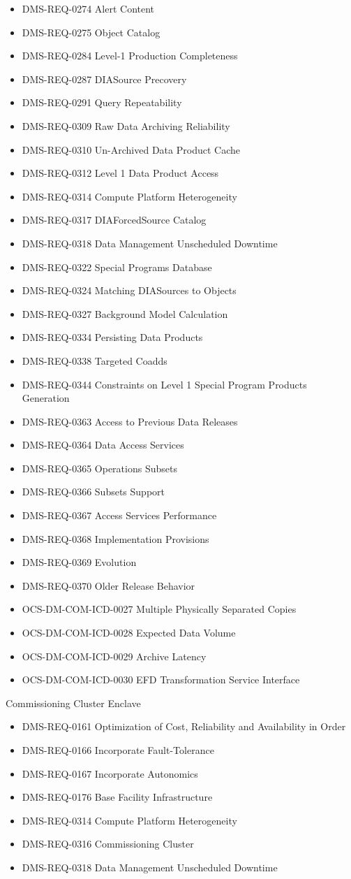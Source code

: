 \begin{itemize}
\item DMS-REQ-0274 Alert Content
\item DMS-REQ-0275 Object Catalog
\item DMS-REQ-0284 Level-1 Production Completeness
\item DMS-REQ-0287 DIASource Precovery
\item DMS-REQ-0291 Query Repeatability
\item DMS-REQ-0309 Raw Data Archiving Reliability
\item DMS-REQ-0310 Un-Archived Data Product Cache
\item DMS-REQ-0312 Level 1 Data Product Access
\item DMS-REQ-0314 Compute Platform Heterogeneity
\item DMS-REQ-0317 DIAForcedSource Catalog
\item DMS-REQ-0318 Data Management Unscheduled Downtime
\item DMS-REQ-0322 Special Programs Database
\item DMS-REQ-0324 Matching DIASources to Objects
\item DMS-REQ-0327 Background Model Calculation
\item DMS-REQ-0334 Persisting Data Products
\item DMS-REQ-0338 Targeted Coadds
\item DMS-REQ-0344 Constraints on Level 1 Special Program Products Generation
\item DMS-REQ-0363 Access to Previous Data Releases
\item DMS-REQ-0364 Data Access Services
\item DMS-REQ-0365 Operations Subsets
\item DMS-REQ-0366 Subsets Support
\item DMS-REQ-0367 Access Services Performance
\item DMS-REQ-0368 Implementation Provisions
\item DMS-REQ-0369 Evolution
\item DMS-REQ-0370 Older Release Behavior
\item OCS-DM-COM-ICD-0027 Multiple Physically Separated Copies
\item OCS-DM-COM-ICD-0028 Expected Data Volume
\item OCS-DM-COM-ICD-0029 Archive Latency
\item OCS-DM-COM-ICD-0030 EFD Transformation Service Interface
\end{itemize}
Commissioning Cluster Enclave \begin{itemize}
\item DMS-REQ-0161 Optimization of Cost, Reliability and Availability in Order
\item DMS-REQ-0166 Incorporate Fault-Tolerance
\item DMS-REQ-0167 Incorporate Autonomics
\item DMS-REQ-0176 Base Facility Infrastructure
\item DMS-REQ-0314 Compute Platform Heterogeneity
\item DMS-REQ-0316 Commissioning Cluster
\item DMS-REQ-0318 Data Management Unscheduled Downtime
\end{itemize}
